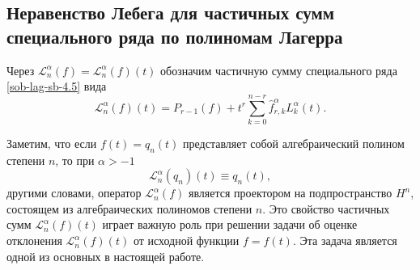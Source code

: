 \subsection{Неравенство Лебега для частичных сумм специального ряда  по полиномам Лагерра}

Через $\mathcal{L}_n^\alpha(f)=\mathcal{L}_n^\alpha(f)(t)$ обозначим частичную сумму специального ряда \eqref{sob-lag-sb-4.5} вида
\begin{equation*}
  \mathcal{L}_n^\alpha(f)(t)=P_{r-1}(f)+t^r\sum\limits_{k=0}^{n-r}\hat{f}_{r,k}^\alpha L_k^\alpha(t).
\end{equation*}

 Заметим, что если $f(t)=q_n(t)$ представляет собой алгебраический полином степени $n$, то при $\alpha>-1$
\begin{equation*}
  \mathcal{L}_n^\alpha(q_n)(t)\equiv q_n(t),
\end{equation*}
другими словами, оператор $\mathcal{L}_n^\alpha(f)$ является проектором на подпространство $H^n$, состоящем из алгебраических полиномов степени $n$.
Это свойство частичных сумм  $\mathcal{L}_n^\alpha(f)(t)$ играет важную роль при решении задачи об оценке отклонения $\mathcal{L}_n^\alpha(f)(t)$ от исходной функции $f=f(t)$. Эта задача является одной из основных в настоящей работе.

